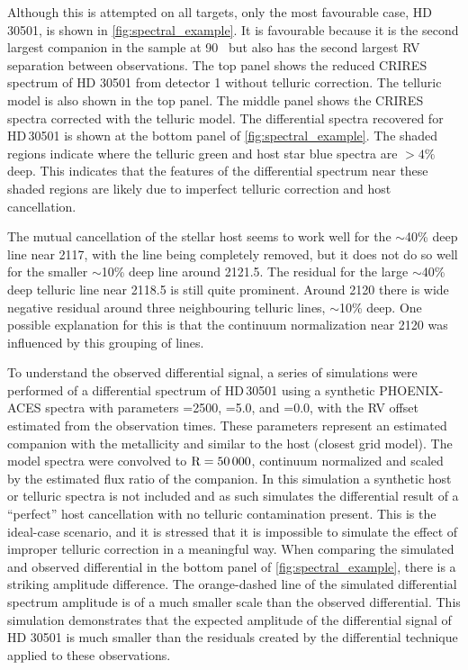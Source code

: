 Although this is attempted on all targets, only the most favourable case, {HD\,30501}, is shown in \cref{fig:spectral_example}.
It is favourable because it is the second largest companion in the sample at 90~\Mjup{} but also has the second largest {RV} separation between observations.
The top panel shows the reduced CRIRES spectrum of {HD 30501} from detector 1 without telluric correction.
The telluric model is also shown in the top panel.
The middle panel shows the CRIRES spectra corrected with the telluric model.
The differential spectra recovered for {HD\,30501} is shown at the bottom panel of \cref{fig:spectral_example}.
The shaded regions indicate where the telluric {green} and host star {blue} spectra are \(> 4\%\) deep.
This indicates that the features of the differential spectrum near these shaded regions are likely due to imperfect telluric correction and host cancellation.

The mutual cancellation of the stellar host seems to work well for the \(\sim\)40\% deep line near 2117\nm{}, with the line being completely removed, but it does not do so well for the smaller \(\sim\)10\% deep line around 2121.5\nm{}.
The residual for the large \(\sim\)40\% deep telluric line near 2118.5\nm{} is still quite prominent.
Around 2120\nm{} there is wide negative residual around three neighbouring telluric lines, \(\sim\)10\% deep.
One possible explanation for this is that the continuum normalization near 2120\nm{} was influenced by this grouping of lines.

To understand the observed differential signal, a series of simulations were performed of a differential spectrum of {HD\,30501} using a synthetic {PHOENIX-ACES} spectra with parameters \Teff{}=2500\K{}, \Logg{}=5.0, and \feh{}=0.0, with the {RV} offset estimated from the observation times.
These parameters represent an estimated companion \Teff{} with the metallicity and \Logg{} similar to the host (closest grid model).
The model spectra were convolved to \(\textrm{R}=50\,000\), continuum normalized and scaled by the estimated flux ratio of the companion.
In this simulation a synthetic host or telluric spectra is not included and as such simulates the differential result of a ``perfect'' host cancellation with no telluric contamination present.
This is the ideal-case scenario, and it is stressed that it is impossible to simulate the effect of improper telluric correction in a meaningful way.
When comparing the simulated and observed differential in the bottom panel of \cref{fig:spectral_example}, there is a striking amplitude difference.
The orange-dashed line of the simulated differential spectrum amplitude is of a much smaller scale than the observed differential.
This simulation demonstrates that the expected amplitude of the differential signal of {HD 30501} is much smaller than the residuals created by the differential technique applied to these observations.

